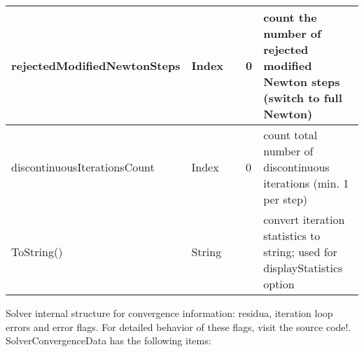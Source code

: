 \begin{center}
\begin{longtable}{| p{4.2cm} | p{2.5cm} | p{0.3cm} | p{3.0cm} | p{6cm} |}
    rejectedModifiedNewtonSteps &     Index &      &     0 &     count the number of rejected modified Newton steps (switch to full Newton)\\ \hline
    discontinuousIterationsCount &     Index &      &     0 &     count total number of discontinuous iterations (min. 1 per step)\\ \hline
    ToString() &     String &      &      &     convert iteration statistics to string; used for displayStatistics option\\ \hline
	  \end{longtable}
	\end{center}

 \label{sec:SolverConvergenceData}
Solver internal structure for convergence information: residua, iteration loop errors and error flags. For detailed behavior of these flags, visit the source code!. \\ 
%
SolverConvergenceData has the following items:
